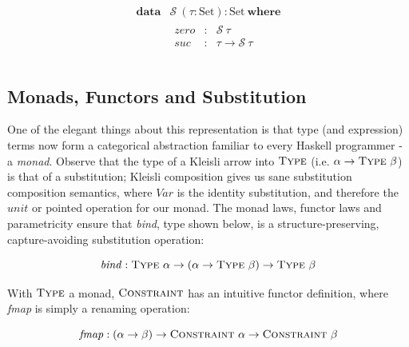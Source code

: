\documentclass[a4paper]{jfp}
\begin{document}
\begin{displaymath}   
	\begin{array}{ll}		
		\textbf{data} & \mathcal{S}\ (\tau : \text{Set}) : \text{Set}\ \textbf{where} \\
		              & \begin{array}{lcl}
                         \mathit{zero} & : & \mathcal{S}\ \tau \\
						 \mathit{suc} & : & \tau \rightarrow \mathcal{S}\ \tau \\
					    \end{array} \\						
     \end{array}
\end{displaymath}	 

\subsection{Monads, Functors and Substitution}

One of the elegant things about this representation is that type (and expression) terms now form a categorical abstraction familiar to every Haskell programmer - a \emph{monad}. Observe that the type of a Kleisli arrow into $\textsc{Type}$ (i.e. $\alpha \rightarrow \textsc{Type}\ \beta$) is that of a substitution; Kleisli composition gives us sane substitution composition semantics, where $\mathit{Var}$ is the identity substitution, and therefore the $\mathit{unit}$ or pointed operation for our monad. The monad laws, functor laws and parametricity ensure that \emph{bind}, type shown below, is a structure-preserving, capture-avoiding substitution operation:

\nopagebreak

\begin{displaymath}
	\mathit{bind} : \textsc{Type}\ \alpha \rightarrow (\alpha \rightarrow \textsc{Type}\ \beta) \rightarrow \textsc{Type}\ \beta
\end{displaymath}

\medskip

With $\textsc{Type}$ a monad, $\textsc{Constraint}$ has an intuitive functor definition, where \emph{fmap} is simply a renaming operation:

\begin{displaymath}
	\mathit{fmap} : (\alpha \rightarrow \beta) \rightarrow \textsc{Constraint}\ \alpha \rightarrow \textsc{Constraint}\ \beta
\end{displaymath}
\end{document}
